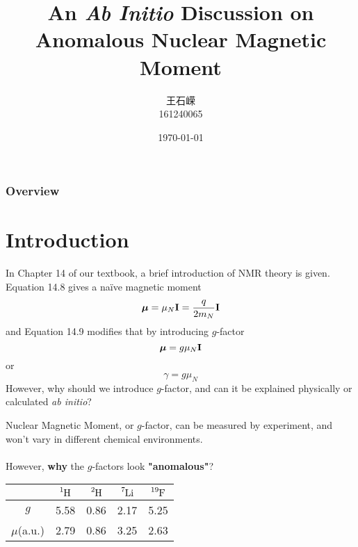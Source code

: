 \documentclass[10pt,aspectratio=43,mathserif]{beamer}
\title[]{An \textsl{Ab Initio} Discussion on\\
	 Anomalous Nuclear Magnetic Moment} %
\author{王石嵘\\161240065} %
\institute[] %
{Kuang Yaming Honors School\\
\medskip
\textit{} %
}
\date{\today} %
\numberwithin{equation}{section}
\begin{document}
\begin{frame}
\titlepage %
\end{frame}

\begin{frame}
\frametitle{Overview} %
\tableofcontents %
\end{frame}


\section{Introduction}
\begin{frame}
In Chapter 14 of our textbook, a brief introduction of NMR theory is given.\\
Equation 14.8 gives a na\"ive magnetic moment
\begin{equation}\label{key}
\bm\mu = \mu_N\vb{I} = \dfrac{q}{2m_N}\vb{I}
\end{equation}
and Equation 14.9 modifies that by introducing $ g $-factor
\begin{equation}\label{key}
\bm\mu = g\mu_N\vb{I}
\end{equation}
or 
\begin{equation}\label{key}
\gamma = g\mu_N
\end{equation}
However, why should we introduce $ g $-factor, and can it be explained physically or calculated \textsl{ab initio}?

\end{frame}

\begin{frame}
Nuclear Magnetic Moment, or $ g $-factor, can be measured by experiment, and won't vary in different chemical environments.\\
~\\
However, \textbf{why} the $ g $-factors look \textbf{"anomalous"}?
\begin{table}
	\centering
	\begin{tabular}{ccccc}
		\hline
		& $ \ce{^1H} $ & $ \ce{^2H} $ & $ \ce{^7Li} $ & $ \ce{^19F} $ \\ \hline
		$ g $ & 5.58 & 0.86 & 2.17 & 5.25 \\
		$ \mu $(a.u.) & 2.79 & 0.86 & 3.25 & 2.63\\
		\hline
	\end{tabular}
\end{table}
\end{frame}
\end{document}
